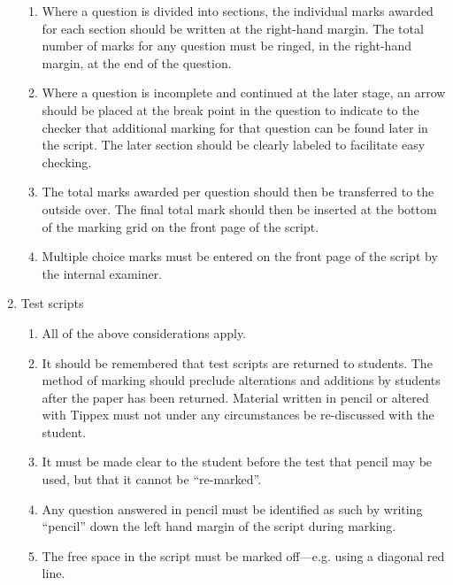 \documentclass{ArcHandout}
\begin{document}
\begin{enumerate}
\begin{enumerate}
    \item Where a question is divided into sections, the individual marks
    awarded for each section should be written at the right-hand margin.
    The total number of marks for any question must be ringed, in the
    right-hand margin, at the end of the question.

    \item Where a question is incomplete and continued at the later stage,
    an arrow should be placed at the break point in the question to
    indicate to the checker that additional marking for that question can
    be found later in the script. The later section should be clearly
    labeled to facilitate easy checking.

    \item The total marks awarded per question should then be transferred
    to the outside over. The final total mark should then be inserted at
    the bottom of the marking grid on the front page of the script.

    \item Multiple choice marks must be entered on the front page of the
    script by the internal examiner.
  \end{enumerate}
  
  \item Test scripts
  \begin{enumerate}
    \item All of the above considerations apply. 
    \item It should be remembered that test scripts are returned to
    students. The method of marking should preclude alterations and
    additions by students after the paper has been returned. Material
    written in pencil or altered with Tippex must not under any
    circumstances be re-discussed with the student.
    \item It must be made clear to the student before the test that pencil
    may be used, but that it cannot be ``re-marked''.
    \item Any question answered in pencil must be identified as such by
    writing ``pencil'' down the left hand margin of the script during
    marking.
    \item The free space in the script must be marked off---e.g. using
    a diagonal red line. 
  \end{enumerate}
\end{enumerate}
\end{document}
